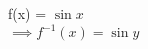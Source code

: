 \documentclass[preview]{standalone}
\begin{document}
\begin{center}
f(x) = $\sin x$ \\             $\implies f^{-1}(x) = \sin y$
\end{center}
\end{document}
